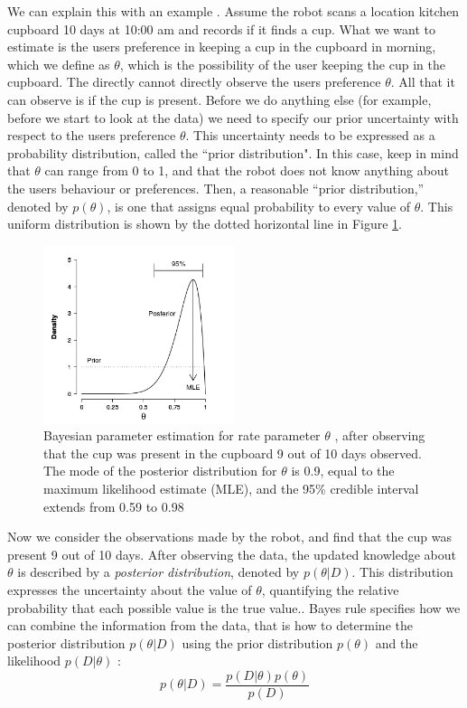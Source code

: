 We can explain this with an example \cite{lee2014bayesian}. Assume the robot scans a location kitchen cupboard 10 days at 10:00 am and records if it finds a cup. What we want to estimate is the users preference in keeping a cup in the cupboard in morning, which we define as $\theta$, which is the possibility of the user keeping the cup in the cupboard. The directly cannot directly observe the users preference $\theta$. All that it can observe is if the cup is present. Before we do anything else (for example, before we start to look at the data) we need to specify our prior uncertainty with respect to the users preference $\theta$. This uncertainty needs to be expressed as a probability distribution, called the ``prior distribution". In this case, keep in mind that $\theta$ can range from 0 to 1, and that the robot does not know anything about the users behaviour or preferences. Then, a reasonable ``prior distribution,” denoted by $p(\theta)$, is one that assigns equal probability to every value of $\theta$. This uniform distribution is shown by the dotted horizontal line in Figure \ref{fig: bayes}.


\begin{figure}[htp]
\centering

\includegraphics[width=0.5\textwidth]{images/bayes.png}
\caption[Bayesian parameter estimation]{Bayesian parameter estimation for rate parameter $\theta$
, after observing that the cup was present in the cupboard 9 out of 10 days observed. The mode of the posterior distribution for $\theta$ is 0.9, equal to the maximum likelihood estimate (MLE), and the 95\% credible interval extends from 0.59 to 0.98}
\label{fig: bayes}
\end{figure}

Now we consider the observations made by the robot, and find that the cup was present 9 out of 10 days. After observing the data, the updated knowledge about $\theta$ is described by a \emph{posterior distribution}, denoted by $p(\theta | D)$. This distribution expresses the uncertainty about the value of $\theta$, quantifying the relative probability that each possible value is the true value.. Bayes rule specifies how we can combine the information from the data, that is how to determine the posterior distribution $p (\theta | D)$ using  the prior distribution $p(\theta)$ and the likelihood  $p (D | \theta)$ :
\begin{equation}
	p(\theta | D) = \frac{p(D | \theta) p(\theta)}{p(D)}
\end{equation}

